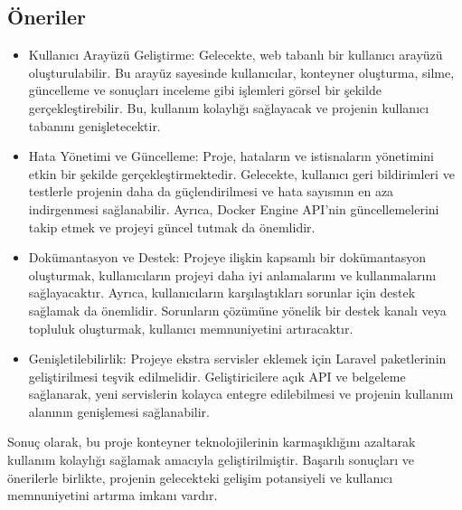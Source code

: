 \subsection*{Öneriler}
\begin{itemize}
    \item Kullanıcı Arayüzü Geliştirme: Gelecekte, web tabanlı bir kullanıcı arayüzü oluşturulabilir. Bu arayüz sayesinde kullanıcılar, konteyner oluşturma, silme, güncelleme ve sonuçları inceleme gibi işlemleri görsel bir şekilde gerçekleştirebilir. Bu, kullanım kolaylığı sağlayacak ve projenin kullanıcı tabanını genişletecektir.
    \item Hata Yönetimi ve Güncelleme: Proje, hataların ve istisnaların yönetimini etkin bir şekilde gerçekleştirmektedir. Gelecekte, kullanıcı geri bildirimleri ve testlerle projenin daha da güçlendirilmesi ve hata sayısının en aza indirgenmesi sağlanabilir. Ayrıca, Docker Engine API'nin güncellemelerini takip etmek ve projeyi güncel tutmak da önemlidir.
    \item Dokümantasyon ve Destek: Projeye ilişkin kapsamlı bir dokümantasyon oluşturmak, kullanıcıların projeyi daha iyi anlamalarını ve kullanmalarını sağlayacaktır. Ayrıca, kullanıcıların karşılaştıkları sorunlar için destek sağlamak da önemlidir. Sorunların çözümüne yönelik bir destek kanalı veya topluluk oluşturmak, kullanıcı memnuniyetini artıracaktır.
    \item Genişletilebilirlik: Projeye ekstra servisler eklemek için Laravel paketlerinin geliştirilmesi teşvik edilmelidir. Geliştiricilere açık API ve belgeleme sağlanarak, yeni servislerin kolayca entegre edilebilmesi ve projenin kullanım alanının genişlemesi sağlanabilir.
\end{itemize}

Sonuç olarak, bu proje konteyner teknolojilerinin karmaşıklığını azaltarak kullanım kolaylığı sağlamak amacıyla geliştirilmiştir. Başarılı sonuçları ve önerilerle birlikte, projenin gelecekteki gelişim potansiyeli ve kullanıcı memnuniyetini artırma imkanı vardır.